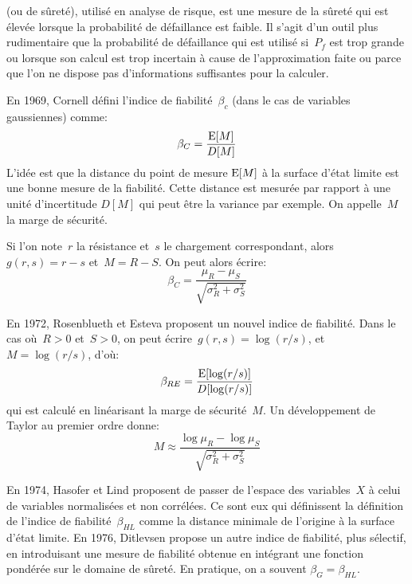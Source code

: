 \begin{histoire}
\medskip
{} (ou de sûreté), utilisé en analyse de risque, est une mesure de la sûreté qui est élevée lorsque la probabilité de défaillance est faible. Il s'agit d'un outil plus rudimentaire que la probabilité de défaillance qui est utilisé si~$P_f$ est trop grande ou lorsque son calcul est trop incertain à cause de l'approximation faite ou parce que l'on ne dispose pas d'informations suffisantes pour la calculer.

En 1969, Cornell défini l'indice de fiabilité~$\beta_c$ (dans le cas de variables gaussiennes) comme:
\begin{equation}
\beta_C=\dfrac{\operatorname{E}[M]}{D[M]}
\end{equation}
L'idée est que la distance du point de mesure $\operatorname{E}[M]$ à la surface d'état limite est une bonne mesure de la fiabilité. Cette distance est mesurée par rapport à une unité d'incertitude $D[M]$ qui peut être la variance par exemple. On appelle~$M$ la marge de sécurité.

Si l'on note~$r$ la résistance et~$s$ le chargement correspondant, alors~$g(r,s)=r-s$ et~$M=R-S$. On peut alors écrire:
$$\beta_C=\dfrac{\mu_R-\mu_S}{\sqrt{\sigma_R^2+\sigma_S^2}}$$

En 1972, Rosenblueth et Esteva proposent un nouvel indice de fiabilité. Dans le cas où~$R>0$ et~$S>0$, on peut écrire~$g(r,s)=\log(r/s)$, et~$M=\log(r/s)$, d'où:
\begin{equation}
\beta_{RE}=\dfrac{\operatorname{E}[\log(r/s)]}{D[\log(r/s)]}
\end{equation}
qui est calculé en linéarisant la marge de sécurité~$M$. Un développement de Taylor au premier ordre donne:
$$M\approx\dfrac{\log\mu_R-\log\mu_S}{\sqrt{\sigma_R^2+\sigma_S^2}}$$

En 1974, Hasofer et Lind proposent de passer de l'espace des variables~$X$ à celui de variables normalisées et non corrélées. Ce sont eux qui définissent la définition de l'indice de fiabilité~$\beta_{HL}$ comme la distance minimale de l'origine à la surface d'état limite.
En 1976, Ditlevsen propose un autre indice de fiabilité, plus sélectif, en introduisant une mesure de fiabilité obtenue en intégrant une fonction pondérée sur le domaine de sûreté. En pratique, on a souvent $\beta_G=\beta_{HL}$.
\end{histoire}

